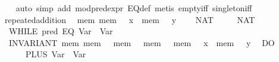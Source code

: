 \begin{isabellebody}
%
\isadelimproof
\ \ %
\endisadelimproof
%
\isatagproof
{}\isamarkupfalse%
\ {}auto\ simp\ add{}\ mod{}pred{}expr\ EQ{}def{}\ {}metis\ empty{}iff\ singleton{}iff{}{}%
\endisatagproof
{\isafoldproof}%
%
\isadelimproof
\isanewline
%
\endisadelimproof
\isanewline
{}\isamarkupfalse%
\ repeated{}addition{}\isanewline
\ \ {}{}{}mem{}\ mem\ {}\ {}\ x\ {}\ mem\ {}\ {}\ y{}{}\isanewline
\ \ {}\ {}{}\ NAT\ {}{}\isanewline
\ \ {}\ {}{}\ NAT\ {}{}\isanewline
\ \ {}WHILE\ {}{}pred\ {}EQ\ {}Var\ {}{}\ {}Var\ {}{}{}{}\isanewline
\ \ INVARIANT\ {}mem{}\ mem\ {}\ {}\ mem\ {}\ {}\ mem\ {}\ {}\ mem\ {}\ {}\ x\ {}\ mem\ {}\ {}\ y{}\isanewline
\ \ DO\isanewline
\ \ \ \ {}\ {}{}\ PLUS\ {}Var\ {}{}\ {}Var\ {}{}{}\isanewline

\end{isabellebody}
